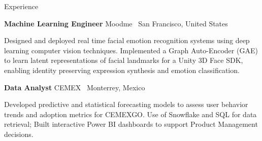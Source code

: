 \begin{rubric}{Experience}

\entry*[9/2023 -- 01/2024]
  \textbf{Machine Learning Engineer} \hfill Moodme \textbar\ San Francisco, United States
  \par
Designed and deployed real time facial emotion recognition systems using deep learning computer vision techniques.
Implemented a Graph Auto-Encoder (GAE) to learn latent representations of facial landmarks for a Unity 3D Face SDK, enabling identity preserving expression synthesis and emotion classification.


\entry*[02/2023 -- 08/2023]
  \textbf{Data Analyst} \hfill CEMEX \textbar\ Monterrey, Mexico
  \par
Developed predictive and statistical forecasting models to assess user behavior trends and adoption metrics for CEMEXGO.
Use of Snowflake and SQL for data retrieval; Built interactive Power BI dashboards to support Product Management decisions.
\end{rubric}
